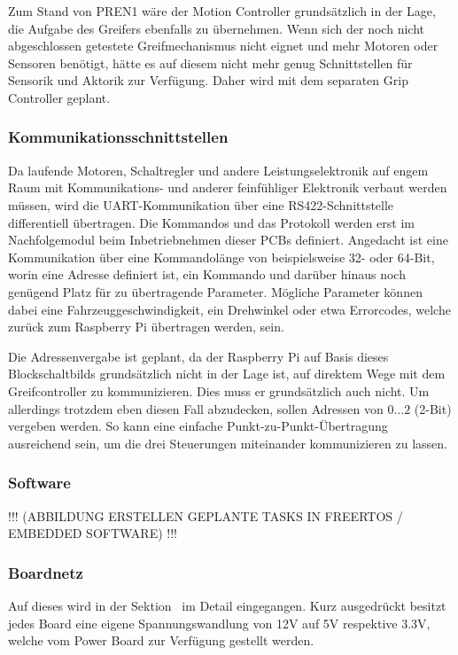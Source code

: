 \documentclass[main.tex]{subfiles} %
\begin{document}
Zum Stand von PREN1 wäre der Motion Controller grundsätzlich in der Lage, die
Aufgabe des Greifers ebenfalls zu übernehmen. Wenn sich der noch nicht
abgeschlossen getestete Greifmechanismus nicht eignet und mehr Motoren oder
Sensoren benötigt, hätte es auf diesem nicht mehr genug Schnittstellen für
Sensorik und Aktorik zur Verfügung. Daher wird mit dem separaten Grip
Controller geplant.

\subsubsection*{Kommunikationsschnittstellen}
Da laufende Motoren, Schaltregler und andere Leistungselektronik auf engem Raum mit
Kommunikations- und anderer feinfühliger Elektronik verbaut werden müssen, wird die UART-Kommunikation
über eine RS422-Schnittstelle differentiell übertragen. Die Kommandos und das Protokoll werden erst
im Nachfolgemodul beim Inbetriebnehmen dieser PCBs definiert. Angedacht ist eine Kommunikation
über eine Kommandolänge von beispielsweise 32- oder 64-Bit, worin eine Adresse definiert ist, ein Kommando und
darüber hinaus noch genügend Platz für zu übertragende Parameter. Mögliche Parameter können dabei
eine Fahrzeuggeschwindigkeit, ein Drehwinkel oder etwa Errorcodes, welche zurück zum Raspberry Pi übertragen werden, sein.

Die Adressenvergabe ist geplant, da der Raspberry Pi auf Basis dieses
Blockschaltbilds grundsätzlich nicht in der Lage ist, auf direktem Wege mit dem
Greifcontroller zu kommunizieren. Dies muss er grundsätzlich auch nicht. Um
allerdings trotzdem eben diesen Fall abzudecken, sollen Adressen von $0 \dots
      2$ (2-Bit) vergeben werden. So kann eine einfache Punkt-zu-Punkt-Übertragung
ausreichend sein, um die drei Steuerungen miteinander kommunizieren zu lassen.

\subsubsection*{Software}
!!! (ABBILDUNG ERSTELLEN GEPLANTE TASKS IN FREERTOS / EMBEDDED SOFTWARE) !!!

\subsubsection*{Boardnetz}
Auf dieses wird in der Sektion~\label{sec:Boardnetz} im Detail eingegangen. Kurz ausgedrückt
besitzt jedes Board eine eigene Spannungswandlung von 12V auf 5V respektive 3.3V, welche vom
Power Board zur Verfügung gestellt werden.
\end{document}
